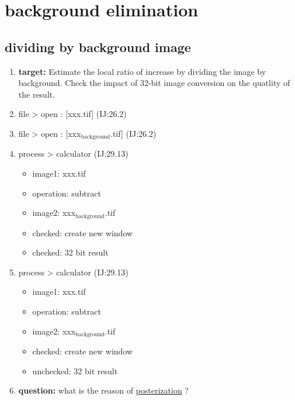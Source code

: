 \documentclass[11pt]{article}
\begin{document}
\section{background elimination}
\label{sec-4}
\subsection{dividing by background image}
\label{sec-4-1}
\begin{enumerate}
\item \textbf{target:} Estimate the local ratio of increase by dividing the
image by background. Check the impact of 32-bit image conversion
on the quatlity of the result.
\item file > open : [xxx.tif] (IJ:26.2)
\item file > open : [xxx$_{\text{background}}$.tif] (IJ:26.2)
\item process > calculator (IJ:29.13)
\begin{itemize}
\item image1: xxx.tif
\item operation: subtract
\item image2: xxx$_{\text{background}}$.tif
\item checked: create new window
\item checked: 32 bit result
\end{itemize}
\item process > calculator (IJ:29.13)
\begin{itemize}
\item image1: xxx.tif
\item operation: subtract
\item image2: xxx$_{\text{background}}$.tif
\item checked: create new window
\item unchecked: 32 bit result
\end{itemize}
\item \textbf{question:} what is the reason of \href{https://en.wikipedia.org/wiki/Posterization}{posterization} ?
\end{enumerate}
\end{document}
